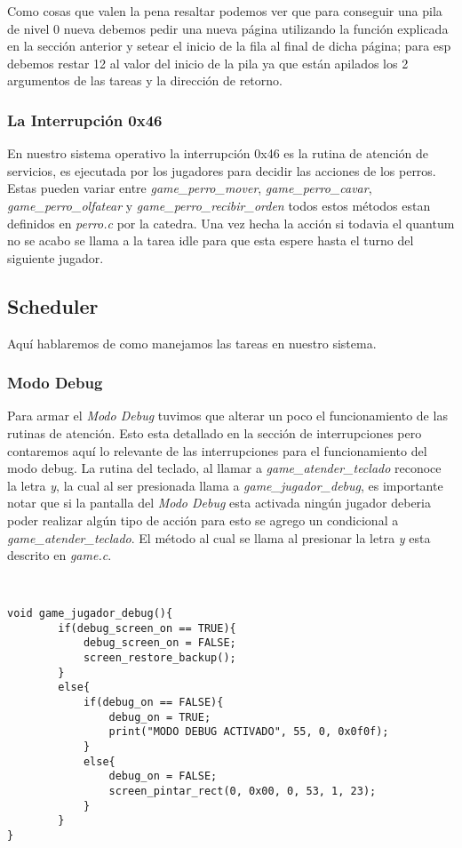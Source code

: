 Como cosas que valen la pena resaltar podemos ver que para conseguir una pila de nivel 0 nueva debemos pedir una nueva página utilizando la función explicada en la sección anterior y setear el inicio de la fila al final de dicha página; para esp debemos restar 12 al valor del inicio de la pila ya que están apilados los 2 argumentos de las tareas y la dirección de retorno.

\subsubsection{La Interrupción 0x46}
En nuestro sistema operativo la interrupción 0x46 es la rutina de atención de servicios, es ejecutada por los jugadores para decidir las acciones de los perros. Estas pueden variar entre  \textit{game\_perro\_mover}, \textit{game\_perro\_cavar}, \textit{game\_perro\_olfatear} y \textit{game\_perro\_recibir\_orden} todos estos métodos estan definidos en \textit{perro.c} por la catedra. Una vez hecha la acción si todavia el quantum no se acabo se llama a la tarea idle para que esta espere hasta el turno del siguiente jugador.


\subsection{Scheduler}
Aquí hablaremos de como manejamos las tareas en nuestro sistema.

\subsubsection{Modo Debug}

Para armar el \textit{Modo Debug} tuvimos que alterar un poco el funcionamiento de las rutinas de atención. Esto esta detallado en la sección de interrupciones pero contaremos aquí lo relevante de las interrupciones para el funcionamiento del modo debug. La rutina del teclado, al llamar a \textit{game\_atender\_teclado} reconoce la letra \textit{y}, la cual al ser presionada llama a \textit{game\_jugador\_debug}, es importante notar que si la pantalla del \textit{Modo Debug} esta activada ningún jugador deberia poder realizar algún tipo de acción para esto se agrego un condicional a \textit{game\_atender\_teclado}. El método al cual se llama al presionar la letra \textit{y} esta descrito en \textit{game.c}.

\begin{lstlisting}


void game_jugador_debug(){
		if(debug_screen_on == TRUE){
			debug_screen_on = FALSE;
			screen_restore_backup();
		}
		else{
			if(debug_on == FALSE){
				debug_on = TRUE;
				print("MODO DEBUG ACTIVADO", 55, 0, 0x0f0f);
			}
			else{
				debug_on = FALSE;
				screen_pintar_rect(0, 0x00, 0, 53, 1, 23);
			}
		}
}

\end{lstlisting}

